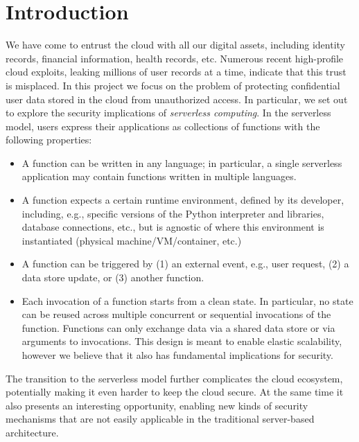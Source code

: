 \section{Introduction}

We have come to entrust the cloud with all our digital assets, 
including identity records, financial information, health records, 
etc. Numerous recent high-profile cloud exploits, leaking millions of 
user records at a time, indicate that this trust is misplaced. In this 
project we focus on the problem of protecting confidential user data 
stored in the cloud from unauthorized access. In particular, we set 
out to explore the security implications of \emph{serverless 
computing}.  In the serverless model, users express their applications 
as collections of functions with the following properties:

\begin{itemize}
    \item A function can be written in any language; in particular, a 
        single serverless application may contain functions written in 
        multiple languages.

    \item A function expects a certain runtime environment, defined by 
        its developer, including, e.g., specific versions of the 
        Python interpreter and libraries, database connections, etc., 
        but is agnostic of where this environment is instantiated 
        (physical machine/VM/container, etc.)


    \item A function can be triggered by (1) an external event, e.g., 
        user request, (2) a data store update, or (3) another 
        function.

    \item Each invocation of a function starts from a clean state. In 
        particular, no state can be reused across multiple concurrent 
        or sequential invocations of the function. Functions can only 
        exchange data via a shared data store or via arguments to 
        invocations. This design is meant to enable elastic         
        scalability, however we believe that it also has fundamental 
        implications for security.
\end{itemize}

The transition to the serverless model further complicates the cloud 
ecosystem, potentially making it even harder to keep the cloud secure.  
At the same time it also presents an interesting opportunity, enabling 
new kinds of security mechanisms that are not easily applicable in the 
traditional server-based architecture.

